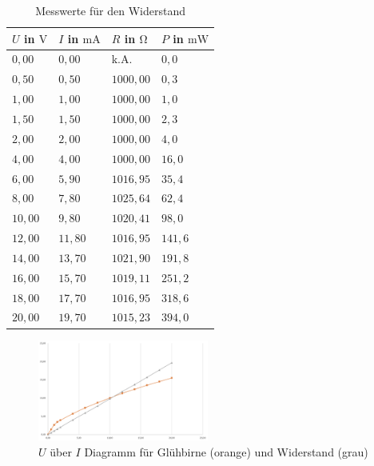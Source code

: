         \begin{table}[h!]
            \centering
            \begin{tabular}{|l|l|l|l|}
                \hline
                $U$ in $\mathrm{V}$ & $I$ in $\mathrm{mA}$ & $R$ in $\mathrm{\Omega}$ & $P$ in $\mathrm{mW}$\\
                \hline\hline
                $0,00$ & $0,00$ & k.A. & $0,0$\\
                \hline
                $0,50$ & $0,50$ & $1000,00$ & $0,3$\\
                \hline
                $1,00$ & $1,00$ & $1000,00$ & $1,0$\\
                \hline
                $1,50$ & $1,50$ & $1000,00$ & $2,3$\\
                \hline
                $2,00$ & $2,00$ & $1000,00$ & $4,0$\\
                \hline
                $4,00$ & $4,00$ & $1000,00$ & $16,0$\\
                \hline
                $6,00$ & $5,90$ & $1016,95$ & $35,4$\\
                \hline
                $8,00$ & $7,80$ & $1025,64$ & $62,4$\\
                \hline
                $10,00$ & $9,80$ & $1020,41$ & $98,0$\\
                \hline
                $12,00$ & $11,80$ & $1016,95$ & $141,6$\\
                \hline
                $14,00$ & $13,70$ & $1021,90$ & $191,8$\\
                \hline
                $16,00$ & $15,70$ & $1019,11$ & $251,2$\\
                \hline
                $18,00$ & $17,70$ & $1016,95$ & $318,6$\\
                \hline
                $20,00$ & $19,70$ & $1015,23$ & $394,0$\\
                \hline
            \end{tabular}
            \caption{Messwerte für den Widerstand}
            \label{tab:widerstand}
        \end{table}

        \begin{figure}[h!]
            \centering
            \includegraphics[width=0.5\textwidth]{bilder/Physik_02.png}
            \caption{$U$ über $I$ Diagramm für Glühbirne (orange) und Widerstand (grau)}
            \label{fig:wertev1}
        \end{figure}

